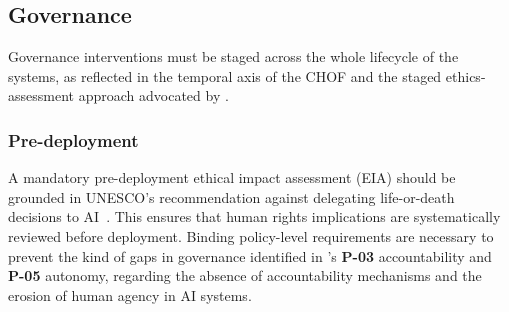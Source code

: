 \subsection{Governance}

Governance interventions must be staged across the whole lifecycle of the systems, as reflected in the temporal axis of the CHOF \citep{info12090385} and the staged ethics-assessment approach advocated by \citet{aimag.v40i1.2848}.

\subsubsection{Pre-deployment} %
A mandatory pre-deployment ethical impact assessment (EIA) should be grounded in UNESCO's recommendation against delegating life-or-death decisions to AI~\citep{unesco2021recommendation}. This ensures that human rights implications are systematically reviewed before deployment. Binding policy-level requirements are necessary to prevent the kind of gaps in governance identified in \citet{khan2021ethicsaisystematicliterature}'s \textbf{P-03} accountability and \textbf{P-05} autonomy, regarding the absence of accountability mechanisms and the erosion of human agency in AI systems.

